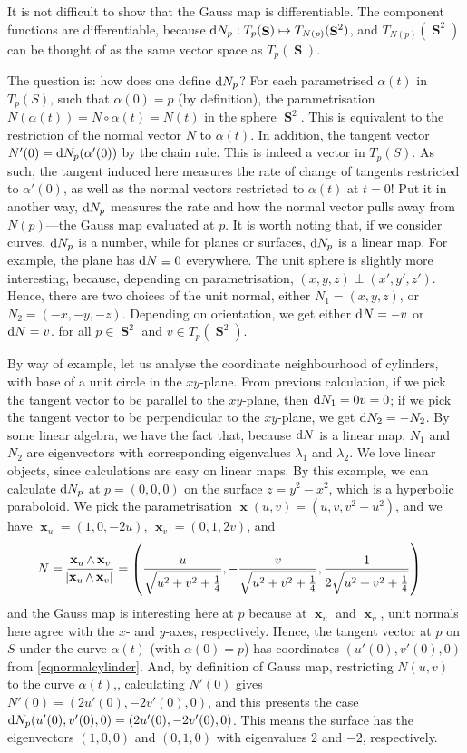 \documentclass{amsart} %
\theoremstyle{mytheoremstyle}
\theoremstyle{definition}
\numberwithin{equation}{section}
\DeclareMathOperator{\1}{\mathbbm{1}}
\DeclareMathOperator{\D}{\dif}
\DeclareMathOperator{\x}{\mathbf{x}}
\DeclareMathOperator{\sphere}{\mathbf{S}}
\begin{document}
It is not difficult to show that the Gauss map is differentiable. The component functions are differentiable, because $\D N_p : T_p (\sphere) \mapsto T_{N(p)} (\sphere^2)$, and $T_{N(p)}(\sphere^2)$ can be thought of as the same vector space as $T_p(\sphere)$.

The question is: how does one define $\D N_p$? For each parametrised $\alpha(t)$ in $T_p (S)$, such that $\alpha(0) = p$ (by definition), the parametrisation $N(\alpha(t)) = N \circ \alpha (t) = N(t) $ in the sphere $\sphere^2$. This is equivalent to the restriction of the normal vector $N$ to $\alpha(t)$. In addition, the tangent vector $N'(0) = \D N_p (\alpha'(0))$ by the chain rule. This is indeed a vector in $T_p(S)$. As such, the tangent induced here measures the rate of change of tangents restricted to $\alpha'(0)$, as well as the normal vectors restricted to $\alpha(t)$ at $t=0$! Put it in another way, $\D N_p$ measures the rate and how the normal vector pulls away from $N(p)$---the Gauss map evaluated at $p$. It is worth noting that, if we consider curves, $\D N_p $ is a number, while for planes or surfaces, $\D N_p$ is a linear map. For example, the plane has $\D N \equiv 0$ everywhere. The unit sphere is slightly more interesting, because, depending on parametrisation, $(x,y,z) \perp (x',y',z')$. Hence, there are two choices of the unit normal, either $N_1 = (x,y,z)$, or $N_2 = (-x,-y,-z)$. Depending on orientation, we get either $\D N = -v$ or $\D N = v$. for all $p \in \sphere^2$ and $v \in T_p (\sphere^2)$. 

By way of example, let us analyse the coordinate neighbourhood of cylinders, with base of a unit circle in the $xy$-plane. From previous calculation, if we pick the tangent vector to be parallel to the $xy$-plane, then $\D N_1 = 0v = 0$; if we pick the tangent vector to be perpendicular to the $xy$-plane, we get $\D N_2 = - N_2$. By some linear algebra, we have the fact that, because $\D N$ is a linear map, $N_1$ and $N_2$ are eigenvectors with corresponding eigenvalues $\lambda_1$ and $\lambda_2$. We love linear objects, since calculations are easy on linear maps. By this example, we can calculate $\D N_p$ at $p=(0,0,0)$ on the surface $z=y^2 - x^2$, which is a hyperbolic paraboloid. We pick the parametrisation $\x(u,v) = (u,v,v^2-u^2)$, and we have $\x_u = (1,0,-2u)$, $\x_v = (0,1,2v)$, and
\begin{align}
\label{eqnormalcylinder}
N = \frac{\x_u \wedge \x_v}{\abs{\x_u \wedge \x_v}} &= \left( \frac{u}{\sqrt{u^2 + v^2 + \frac{1}{4}}} , - \frac{v}{\sqrt{u^2 + v^2 + \frac{1}{4}}} , \frac{1}{2 \sqrt{u^2 + v^2 + \frac{1}{4}}} \right)
\end{align}
and the Gauss map is interesting here at $p$ because at $\x_u$ and $\x_v$, unit normals here agree with the $x$- and $y$-axes, respectively. Hence, the tangent vector at $p$ on $S$ under the curve $\alpha(t)$ (with $\alpha(0)= p$) has coordinates $(u'(0),v'(0),0)$ from \eqref{eqnormalcylinder}. And, by definition of Gauss map, restricting $N(u,v)$ to the curve $\alpha(t)$,, calculating $N'(0)$ gives $N'(0) = (2u'(0),-2v'(0),0)$, and this presents the case $\D N_p (u'(0),v'(0),0) = (2u'(0),-2v'(0),0)$. This means the surface has the eigenvectors $(1,0,0)$ and $(0,1,0)$ with eigenvalues $2$ and $-2$, respectively.
\end{document}

